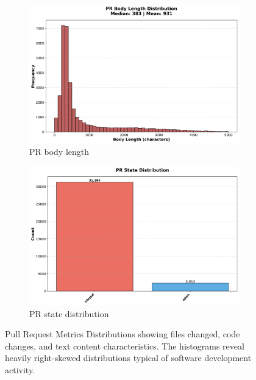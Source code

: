 \documentclass[11pt]{article}
\begin{document}
\begin{figure}[H]
\begin{subfigure}[b]{0.48\textwidth}
\centering
\includegraphics[width=\textwidth]{figures_individual/08_pr_body_length_histogram.png}
\caption{PR body length}
\label{fig:pr_body}
\end{subfigure}
\hfill
\begin{subfigure}[b]{0.48\textwidth}
\centering
\includegraphics[width=\textwidth]{figures_individual/09_pr_state_distribution.png}
\caption{PR state distribution}
\label{fig:pr_state}
\end{subfigure}

\caption{Pull Request Metrics Distributions showing files changed, code changes, and text content characteristics. The histograms reveal heavily right-skewed distributions typical of software development activity.}
\label{fig:pr_distributions_all}
\end{figure}
\end{document}

